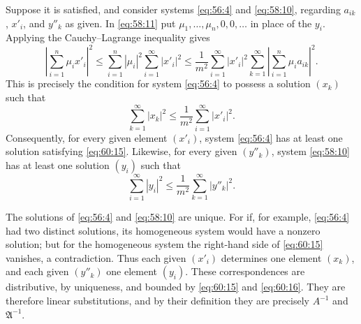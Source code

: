 \documentclass[
  paper=b5,
  fontsize=13pt,
  twoside=true,
  open=any,
  bookmarkpackage=false,
  chapterprefix=true,
  headings=normal
]{scrbook}
\theoremstyle{definition}
\begin{document}
Suppose it is satisfied, and consider systems \eqref{eq:56:4} and
\eqref{eq:58:10}, regarding $a_{ik}$, $x'_i$, and $y''_k$ as given. In
\eqref{eq:58:11} put $\mu_1,\ldots,\mu_n,0,0,\ldots$ in place of the
$y_i$. Applying the Cauchy--Lagrange inequality gives
\[
 \left|\sum_{i=1}^{n}\mu_i x'_i\right|^2
 \leq\sum_{i=1}^{n}|\mu_i|^2\sum_{i=1}^{\infty}|x'_i|^2
 \leq\frac1{m^2}\sum_{i=1}^{\infty}|x'_i|^2
   \sum_{k=1}^{\infty}
     \left|\sum_{i=1}^{n}\mu_i a_{ik}\right|^2.
\]
This is precisely the condition for system \eqref{eq:56:4} to possess a
solution $(x_k)$ such that
\begin{equation}
  \sum_{k=1}^{\infty}|x_k|^2
  \leq\frac1{m^2}\sum_{i=1}^{\infty}|x'_i|^2.
  \tag{15}\label{eq:60:15}
\end{equation}
Consequently, for every given element $(x'_i)$, system
\eqref{eq:56:4} has at least one solution satisfying \eqref{eq:60:15}.
Likewise, for every given $(y''_k)$, system \eqref{eq:58:10} has at least
one solution $(y_i)$ such that
\begin{equation}
  \sum_{i=1}^{\infty}|y_i|^2
  \leq\frac1{m^2}\sum_{k=1}^{\infty}|y''_k|^2.
  \tag{16}\label{eq:60:16}
\end{equation}

The solutions of \eqref{eq:56:4} and \eqref{eq:58:10} are unique. For if,
for example, \eqref{eq:56:4} had two distinct solutions, its homogeneous
system would have a nonzero solution; but for the homogeneous system the
right-hand side of \eqref{eq:60:15} vanishes, a contradiction. Thus each
given $(x'_i)$ determines one element $(x_k)$, and each given $(y''_k)$ one
element $(y_i)$. These correspondences are distributive, by uniqueness,
and bounded by \eqref{eq:60:15} and \eqref{eq:60:16}. They are therefore
linear substitutions, and by their definition they are precisely
$A^{-1}$ and $\mathfrak A^{-1}$.
\end{document}
